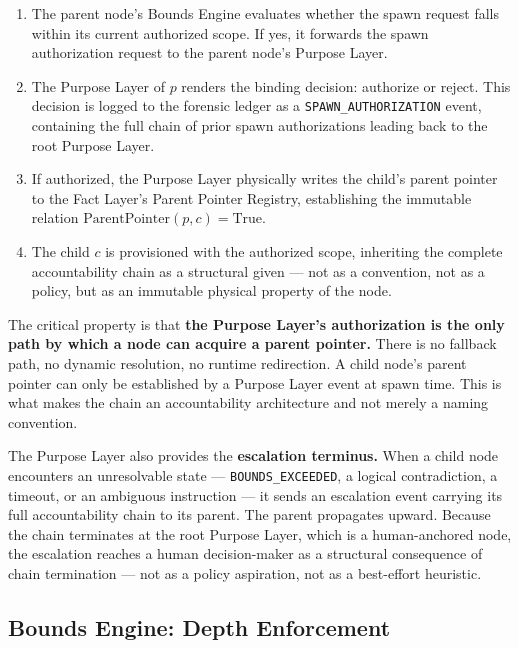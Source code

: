 \begin{enumerate}

\item The parent node's Bounds Engine evaluates whether the spawn request falls within its current authorized scope. If yes, it forwards the spawn authorization request to the parent node's Purpose Layer.

\item The Purpose Layer of $p$ renders the binding decision: authorize or reject. This decision is logged to the forensic ledger as a \texttt{SPAWN\_AUTHORIZATION} event, containing the full chain of prior spawn authorizations leading back to the root Purpose Layer.

\item If authorized, the Purpose Layer physically writes the child's parent pointer to the Fact Layer's Parent Pointer Registry, establishing the immutable relation $\text{ParentPointer}(p, c) = \text{True}$.

\item The child $c$ is provisioned with the authorized scope, inheriting the complete accountability chain as a structural given — not as a convention, not as a policy, but as an immutable physical property of the node.

\end{enumerate}

The critical property is that \textbf{the Purpose Layer's authorization is the only path by which a node can acquire a parent pointer.} There is no fallback path, no dynamic resolution, no runtime redirection. A child node's parent pointer can only be established by a Purpose Layer event at spawn time. This is what makes the chain an accountability architecture and not merely a naming convention.

The Purpose Layer also provides the \textbf{escalation terminus.} When a child node encounters an unresolvable state — \texttt{BOUNDS\_EXCEEDED}, a logical contradiction, a timeout, or an ambiguous instruction — it sends an escalation event carrying its full accountability chain to its parent. The parent propagates upward. Because the chain terminates at the root Purpose Layer, which is a human-anchored node, the escalation reaches a human decision-maker as a structural consequence of chain termination — not as a policy aspiration, not as a best-effort heuristic.


\subsection{Bounds Engine: Depth Enforcement}
\label{sec:bounds-engine-depth}

